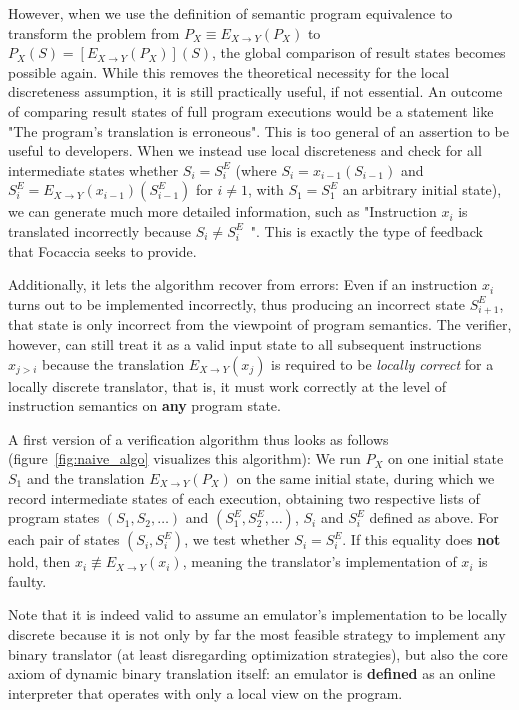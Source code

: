 However, when we use the definition of semantic program equivalence to transform the problem from $P_X \equiv E_{X
\rightarrow Y}(P_X)$ to $P_X(S) = [E_{X \rightarrow Y}(P_X)](S)$, the global comparison of result states becomes
possible again.  While this removes the theoretical necessity for the local discreteness assumption, it is still
practically useful, if not essential. An outcome of comparing result states of full program executions would be a
statement like "The program's translation is erroneous". This is too general of an assertion to be useful to developers.
When we instead use local discreteness and check for all intermediate states whether $S_i = S^E_i$ (where $S_i =
x_{i-1}(S_{i-1})$ and $S^E_i = E_{X \rightarrow Y}(x_{i-1})(S^E_{i-1})$ for $i \neq 1$, with $S_1 = S^E_1$ an arbitrary
initial state), we can generate much more detailed information, such as "Instruction $x_i$ is translated incorrectly
because $S_i \neq S^E_i$~". This is exactly the type of feedback that Focaccia seeks to provide.

Additionally, it lets the algorithm recover from errors: Even if an instruction $x_i$ turns out to be implemented
incorrectly, thus producing an incorrect state $S^E_{i+1}$, that state is only incorrect from the viewpoint of program
semantics. The verifier, however, can still treat it as a valid input state to all subsequent instructions $x_{j > i}$
because the translation $E_{X \rightarrow Y}(x_j)$ is required to be \textit{locally correct} for a locally discrete
translator, that is, it must work correctly at the level of instruction semantics on \textbf{any} program state.

A first version of a verification algorithm thus looks as follows (figure~\ref{fig:naive_algo} visualizes this
algorithm): We run $P_X$ on one initial state $S_1$ and the translation $E_{X \rightarrow Y}(P_X)$ on the same initial
state, during which we record intermediate states of each execution, obtaining two respective lists of program states
$(S_1, S_2, …)$ and $(S^E_1, S^E_2, …)$, $S_i$ and $S^E_i$ defined as above. For each pair of states $(S_i, S^E_i)$, we
test whether $S_i = S^E_i$. If this equality does \textbf{not} hold, then $x_i \not\equiv E_{X \rightarrow Y}(x_i)$,
meaning the translator's implementation of $x_i$ is faulty.

Note that it is indeed valid to assume an emulator's implementation to be locally discrete because it is not only by far
the most feasible strategy to implement any binary translator (at least disregarding optimization strategies), but also
the core axiom of dynamic binary translation itself: an emulator is \textbf{defined} as an online interpreter that
operates with only a local view on the program.

